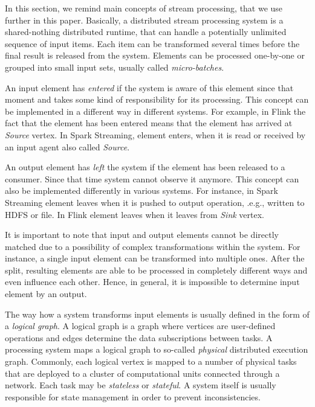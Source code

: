 In this section, we remind main concepts of stream processing, that we use further in this paper. Basically, a distributed stream processing system is a shared-nothing distributed runtime, that can handle a potentially unlimited sequence of input items. Each item can be transformed several times before the final result is released from the system. Elements can be processed one-by-one or grouped into small input sets, usually called {\em micro-batches}. 

An input element has {\em entered} if the system is aware of this element since that moment and takes some kind of responsibility for its processing. This concept can be implemented in a different way in different systems. For example, in Flink the fact that the element has been entered means that the element has arrived at {\em Source} vertex. In Spark Streaming, element enters, when it is read or received by an input agent also called {\em Source}. 

An output element has {\em left} the system if the element has been released to a consumer. Since that time system cannot observe it anymore. This concept can also be implemented differently in various systems. For instance, in Spark Streaming element leaves when it is pushed to output operation, .e.g., written to HDFS or file. In Flink element leaves when it leaves from {\em Sink} vertex.   

It is important to note that input and output elements cannot be directly matched due to a possibility of complex transformations within the system. For instance, a single input element can be transformed into multiple ones. After the split, resulting elements are able to be processed in completely different ways and even influence each other. Hence, in general, it is impossible to determine input element by an output.

The way how a system transforms input elements is usually defined in the form of a {\em logical graph}. A logical graph is a graph where vertices are user-defined operations and edges determine the data subscriptions between tasks. A processing system maps a logical graph to so-called {\em physical} distributed execution graph. Commonly, each logical vertex is mapped to a number of physical tasks that are deployed to a cluster of computational units connected through a network. Each task may be {\em stateless} or {\em stateful}. A system itself is usually responsible for state management in order to prevent inconsistencies.


